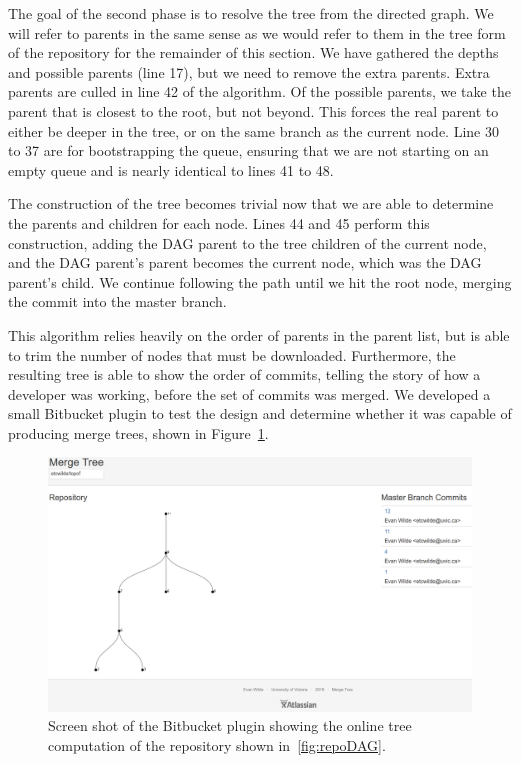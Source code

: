 The goal of the second phase is to resolve the tree from the directed
graph. We will refer to parents in the same sense as we would refer to
them in the tree form of the repository for the remainder of this
section. We have gathered the depths and possible parents (line 17), but
we need to remove the extra parents. Extra parents are culled in line 42
of the algorithm. Of the possible parents, we take the parent that is
closest to the root, but not beyond. This forces the real parent to
either be deeper in the tree, or on the same branch as the current node.
Line 30 to 37 are for bootstrapping the queue, ensuring that we are not
starting on an empty queue and is nearly identical to lines 41 to 48.

The construction of the tree becomes trivial now that we are able to
determine the parents and children for each node. Lines 44 and 45
perform this construction, adding the DAG parent to the tree children of the
current node, and the DAG parent's parent becomes the current node,
which was the DAG parent's child. We continue following the path until
we hit the root node, merging the commit into the master branch.

This algorithm relies heavily on the order of parents in the parent
list, but is able to trim the number of nodes that must be downloaded.
Furthermore, the resulting tree is able to show the order of commits,
telling the story of how a developer was working, before the set of
commits was merged. We developed a small Bitbucket plugin to test the
design and determine whether it was capable of producing merge trees,
shown in Figure~\ref{fig:b_plugin}.

\begin{figure}[htpb]
  \centering
  \includegraphics[width=\linewidth]{figures/plugin.png}
  \caption{Screen shot of the Bitbucket plugin showing the online tree
    computation of the repository shown in~\ref{fig:repoDAG}.}
  \label{fig:b_plugin}
\end{figure}


